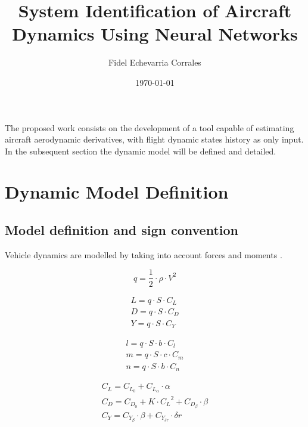 \documentclass[12pt]{article}
\title{System Identification of Aircraft Dynamics Using Neural Networks}
\author{Fidel Echevarria Corrales}
\date{\today}
\begin{document}
\maketitle

The proposed work consists on the development of a tool capable of estimating aircraft aerodynamic derivatives, with flight dynamic states history as only input. In the subsequent section the dynamic model will be defined and detailed.


\section{Dynamic Model Definition}

\subsection{Model definition and sign convention}

Vehicle dynamics are modelled by taking into account forces and moments \cite{Stevens2003}.

\begin{equation}\label{eq1}
    q=\frac{1}{2} \cdot \rho \cdot V^2
\end{equation}

\begin{equation}\label{eq2}
\begin{gathered}
    L=q \cdot S \cdot C_L \\
    D=q \cdot S \cdot C_D \\
    Y=q \cdot S \cdot C_Y
\end{gathered}
\end{equation}

\begin{equation}\label{eq2}
\begin{gathered}
    l=q \cdot S \cdot b \cdot C_l \\
    m=q \cdot S \cdot c \cdot C_m \\
    n=q \cdot S \cdot b \cdot C_n
\end{gathered}
\end{equation}

\begin{equation}\label{eq2}
\begin{gathered}
    C_L=C_{L_0} + C_{L_{\alpha}} \cdot \alpha \\
    C_D=C_{D_0} + K \cdot {C_L}^2 + C_{D_{\beta}} \cdot \beta \\
    C_Y=C_{Y_{\beta}} \cdot \beta + C_{Y_{\delta r}} \cdot \delta r
\end{gathered}
\end{equation}
\end{document}

